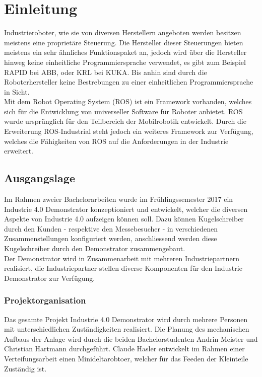 \chapter{Einleitung}
\label{sec:Einleitung}
Industrieroboter, wie sie von diversen Herstellern angeboten werden besitzen meistens eine proprietäre Steuerung. Die Hersteller dieser Steuerungen bieten meistens ein sehr ähnliches Funktionspaket an, jedoch wird über die Hersteller hinweg keine einheitliche Programmiersprache verwendet, es gibt zum Beispiel RAPID bei ABB, oder KRL bei KUKA. Bis anhin sind durch die Roboterhersteller keine Bestrebungen zu einer einheitlichen Programmiersprache in Sicht. \\
Mit dem Robot Operating System (ROS) ist ein Framework vorhanden, welches sich für die Entwicklung von universeller Software für Roboter anbietet. ROS wurde ursprünglich für den Teilbereich der Mobilrobotik entwickelt. Durch die Erweiterung ROS-Industrial steht jedoch ein weiteres Framework zur Verfügung, welches die Fähigkeiten von ROS auf die Anforderungen in der Industrie erweitert. 


\section{Ausgangslage}
\label{sec:Ausgangslage}
Im Rahmen zweier Bachelorarbeiten wurde im Frühlingssemester 2017 ein Industrie 4.0 Demonstrator konzeptioniert und entwickelt, welcher die diversen Aspekte von Industrie 4.0 aufzeigen können soll. Dazu können Kugelschreiber durch den Kunden - respektive den Messebesucher - in verschiedenen Zusammenstellungen konfiguriert werden, anschliessend werden diese Kugelschreiber durch den Demonstrator zusammengebaut. \\
Der Demonstrator wird in Zusammenarbeit mit mehreren Industriepartnern realisiert, die Industriepartner stellen diverse Komponenten für den Industrie Demonstrator zur Verfügung.

\subsection{Projektorganisation}
Das gesamte Projekt Industrie 4.0 Demonstrator wird durch mehrere Personen mit unterschiedlichen Zuständigkeiten realisiert. Die Planung des mechanischen Aufbaus der Anlage wird durch die beiden Bachelorstudenten Andrin Meister und Christian Hartmann durchgeführt. Claude Hasler entwickelt im Rahmen einer Verteifungsarbeit einen Minideltarobtoer, welcher für das Feeden der Kleinteile Zuständig ist.

